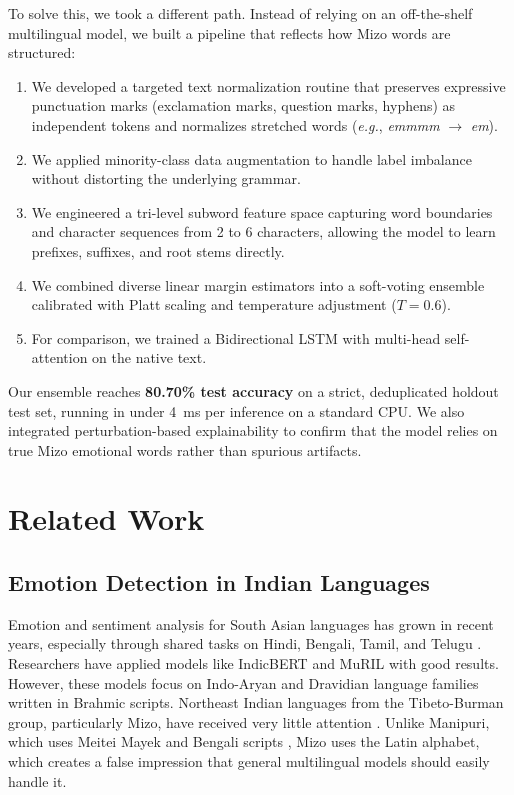 \documentclass[conference]{IEEEtran}
\begin{document}
To solve this, we took a different path. Instead of relying on an off-the-shelf multilingual model, we built a pipeline that reflects how Mizo words are structured:
\begin{enumerate}
    \item We developed a targeted text normalization routine that preserves expressive punctuation marks (exclamation marks, question marks, hyphens) as independent tokens and normalizes stretched words (\textit{e.g.}, \textit{emmmm} $\to$ \textit{em}).
    \item We applied minority-class data augmentation to handle label imbalance without distorting the underlying grammar.
    \item We engineered a tri-level subword feature space capturing word boundaries and character sequences from 2 to 6 characters, allowing the model to learn prefixes, suffixes, and root stems directly.
    \item We combined diverse linear margin estimators into a soft-voting ensemble calibrated with Platt scaling and temperature adjustment ($T=0.6$).
    \item For comparison, we trained a Bidirectional LSTM with multi-head self-attention on the native text.
\end{enumerate}

Our ensemble reaches \textbf{80.70\% test accuracy} on a strict, deduplicated holdout test set, running in under 4~ms per inference on a standard CPU. We also integrated perturbation-based explainability to confirm that the model relies on true Mizo emotional words rather than spurious artifacts.

\section{Related Work}

\subsection{Emotion Detection in Indian Languages}
Emotion and sentiment analysis for South Asian languages has grown in recent years, especially through shared tasks on Hindi, Bengali, Tamil, and Telugu \cite{patra2018sentiment}. Researchers have applied models like IndicBERT \cite{kakwani2020indicnlpsuite} and MuRIL \cite{khanuja2021muril} with good results. However, these models focus on Indo-Aryan and Dravidian language families written in Brahmic scripts. Northeast Indian languages from the Tibeto-Burman group, particularly Mizo, have received very little attention \cite{singh2021sentiment}. Unlike Manipuri, which uses Meitei Mayek and Bengali scripts \cite{singh2018transliteration}, Mizo uses the Latin alphabet, which creates a false impression that general multilingual models should easily handle it.
\end{document}
